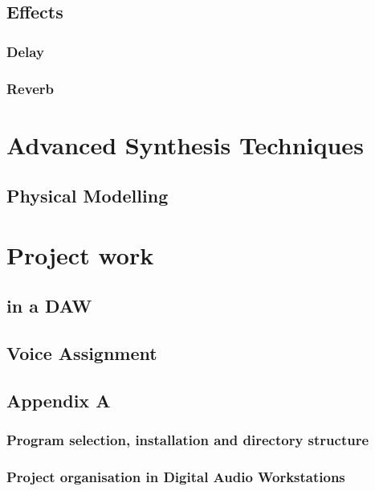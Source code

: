 \documentclass[11pt]{article}
\begin{document}
\subsection{Effects}
\label{sec:org8016d9e}
\subsubsection{Delay}
\label{sec:org9338ccc}
\subsubsection{Reverb}
\label{sec:org25a59c7}

\section{Advanced Synthesis Techniques}
\label{sec:org81b6f46}
\subsection{Physical Modelling}
\label{sec:org80ba26f}

\section{Project work}
\label{sec:org7e1f4ec}
\subsection{in a DAW}
\label{sec:orgedf7441}
\subsection{Voice Assignment}
\label{sec:org0ff44a5}

\subsection{Appendix A}
\label{sec:org9b6a427}
\subsubsection{Program selection, installation and directory structure}
\label{sec:org2e67cd5}
\subsubsection{Project organisation in Digital Audio Workstations}
\label{sec:org41c037b}
\end{document}
